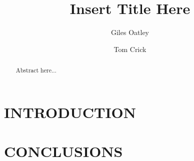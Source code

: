 \documentclass{AISB2008}
\begin{document}
\title{Insert Title Here}

\author{Giles Oatley \and Tom Crick }

\maketitle


\begin{abstract}
Abstract here...
\end{abstract}

\section{INTRODUCTION}



\section{CONCLUSIONS}




\end{document}
